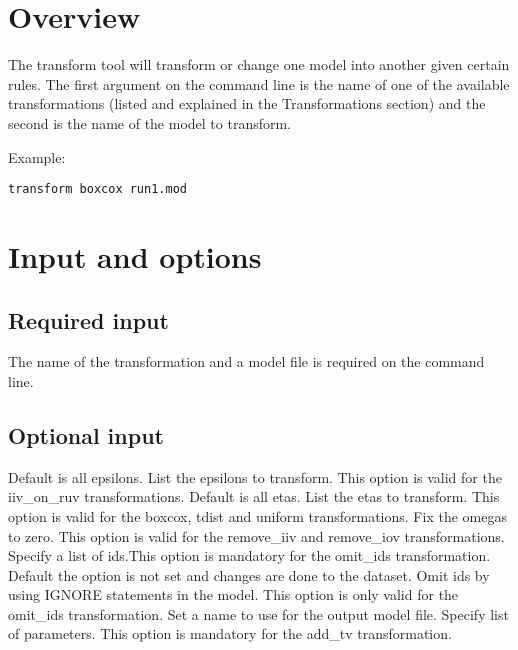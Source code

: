 



\maketitle
\newcommand{\guidetoolname}{transform}


\section{Overview}
The transform tool will transform or change one model into another given certain rules. The first argument on the command line is the name of one of the available transformations (listed and explained in the Transformations section) and the second is the name of the model to transform.

Example:
\begin{verbatim}
transform boxcox run1.mod
\end{verbatim}

\section{Input and options}

\subsection{Required input}
The name of the transformation and a model file is required on the command line.

\subsection{Optional input}

\begin{optionlist}

Default is all epsilons. List the epsilons to transform. This option is valid for the iiv\_on\_ruv transformations.
\nextopt
{}
Default is all etas. List the etas to transform. This option is valid for the boxcox, tdist and uniform transformations.
\nextopt
{}
Fix the omegas to zero. This option is valid for the remove\_iiv and remove\_iov transformations.
\nextopt
{}
Specify a list of ids.This option is mandatory for the omit\_ids transformation.
\nextopt
{}
Default the option is not set and changes are done to the dataset. Omit ids by using IGNORE statements in the model. This option is only valid for the omit\_ids transformation.
\nextopt
{}
Set a name to use for the output model file. 
\nextopt
{}
Specify list of parameters. This option is mandatory for the add\_tv transformation.
\nextopt
\end{optionlist}

